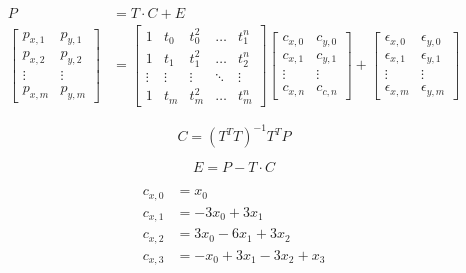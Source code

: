 \begin{align}
    P &= T\cdot C + E \\
    \begin{bmatrix}
        p_{x,1} & p_{y,1} \\ p_{x,2} & p_{y,2} \\ \vdots & \vdots \\ p_{x,m} & p_{y,m}
    \end{bmatrix}
    &=
    \begin{bmatrix}
        1      & t_0     & t_0^2     & \ldots & t_1^n \\
        1      & t_1     & t_1^2     & \ldots & t_2^n \\
        \vdots & \vdots  & \vdots    & \ddots & \vdots \\
        1      & t_m     & t_m^2     & \ldots & t_m^n
    \end{bmatrix}
    \begin{bmatrix}
        c_{x,0} & c_{y,0} \\
        c_{x,1} & c_{y,1} \\
        \vdots  & \vdots \\
        c_{x,n} & c_{c,n}
    \end{bmatrix}
    +
    \begin{bmatrix}
        \epsilon_{x,0} & \epsilon_{y,0} \\
        \epsilon_{x,1} & \epsilon_{y,1} \\
        \vdots         & \vdots \\
        \epsilon_{x,m} & \epsilon_{y,m}
    \end{bmatrix}
\end{align}

\begin{equation}
    C = (T^T T)^{-1} T^T P
\end{equation}

\begin{equation}
    E = P - T\cdot C
\end{equation}

\begin{align*}
    c_{x,0} &= x_0 \\
    c_{x,1} &= -3x_0 + 3x_1 \\
    c_{x,2} &= 3x_0 - 6x_1 + 3x_2 \\
    c_{x,3} &= -x_0 + 3x_1 - 3x_2 + x_3
\end{align*}
